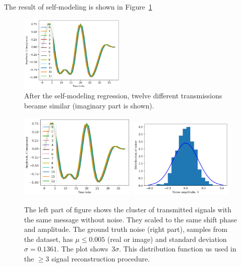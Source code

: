 \documentclass[12pt]{article}
\begin{document}

The result of self-modeling is shown in Figure~\ref{fig:cluster}
\begin{figure}[!tp]
\centering
\includegraphics[width=0.45\textwidth]{fig_cluster}
\caption{After the self-modeling regression, twelve different transmissions became similar (imaginary part is shown).}
\label{fig:cluster}
\end{figure}
\begin{figure}[!h]
\centering
\includegraphics[width=0.5\textwidth]{fig_cluster}
\includegraphics[width=0.45\textwidth]{fig_noise_pdf}
\caption{The left part of figure shows the cluster of transmitted signals with the same message without noise. They scaled to the same shift phase and amplitude.  The ground truth noise (right part), samples from the dataset, has $\mu\leq 0.005$ (real or image) and standard deviation~$\sigma =  0.1361$. The plot shows~$3 \sigma$. This distribution function us used in the $\geq 3$ signal reconstruction procedure. }  %
\label{fig:demo}
\end{figure}
\end{document}
